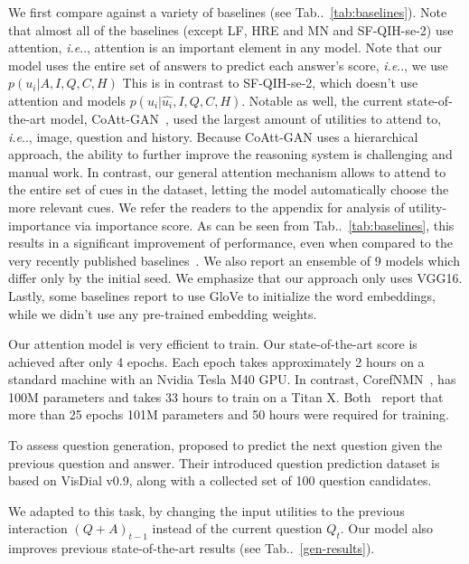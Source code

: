 \documentclass[10pt,twocolumn,letterpaper]{article}
\makeatletter
\def\@onedot{\ifx\@let@token.\else.\null\fi\xspace}
\DeclareRobustCommand\onedot{\futurelet\@let@token\@onedot}
\newcommand{\tabref}[1]{Tab\onedot~\ref{#1}}
\def\ie{\emph{i.e}\onedot} \def\Ie{\emph{I.e}\onedot}
\makeatother
\begin{document}
 We first compare against a variety of baselines (see \tabref{tab:baselines}). Note that almost all of the baselines (except LF, HRE and MN and SF-QIH-se-2) use attention, \ie, attention is an important element in any model. Note that our model uses the entire set of answers to predict each answer's score, \ie, we use $p(u_i|A, I, Q, C, H) $ This is in contrast to SF-QIH-se-2, which doesn't use attention and models $ p(u_i|\hat{u_i}, I, Q, C, H) $.
Notable as well, the current state-of-the-art model, CoAtt-GAN~\cite{wu2017you}, used the largest amount of utilities to attend to, \ie, image, question and history. Because CoAtt-GAN  uses a hierarchical  approach, the ability to further improve the reasoning system is  challenging and manual work.  In contrast, our general attention mechanism allows to attend to the entire set of cues  in the dataset,  letting the model automatically choose the more relevant cues.  
We refer the readers to the appendix for analysis of utility-importance via importance score. As can be seen from \tabref{tab:baselines}, this results in a significant improvement of performance, even when compared to the very recently published baselines~\cite{jain2018two, wu2017you, kottur2018visual}. 
We also report an ensemble of 9 models which differ only by the initial seed. We emphasize that our approach only uses VGG16. Lastly, some baselines report to use GloVe to initialize the word embeddings, while we didn't use any pre-trained embedding weights. 

Our attention model is very efficient to train. 
Our state-of-the-art score is achieved after only 4 epochs. Each epoch takes approximately 2 hours on a standard machine with an Nvidia Tesla M40 GPU. In contrast, CorefNMN~\cite{kottur2018visual}, has 100M parameters and takes 33 hours to train on a Titan X. Both~\cite{lu2017best,wu2017you}  report that more than 25 epochs 101M parameters and 50 hours were required for training. 

  To assess question generation,  \cite{jain2018two} proposed to predict the next question given the previous  question and answer. Their introduced question prediction dataset is based on VisDial v0.9, along with a collected set of 100 question candidates. 

 We adapted to this task, by changing the input utilities to the previous interaction $ (Q+A)_{t-1} $ instead of the current question $ Q_t $. Our model also improves  previous state-of-the-art results (see \tabref{gen-results}). 
\end{document}
